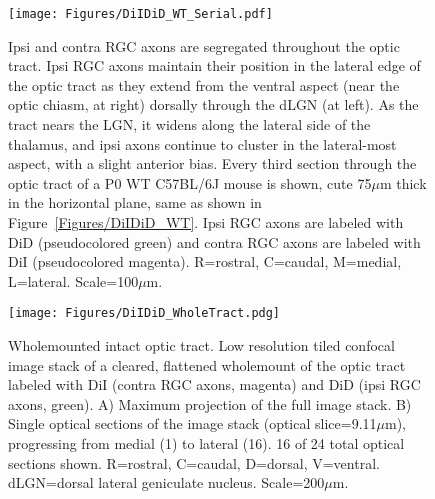 \begin{figure}[hbtp]
    \begin{center}
        \texttt{[image: Figures/DiIDiD\_WT\_Serial.pdf]}
        \caption[Ipsi and contra RGC axons are segregated throughout the optic tract.]
        {Ipsi and contra RGC axons are segregated throughout the optic tract.
        Ipsi RGC axons maintain their position in the lateral edge of the optic tract as they extend from the ventral aspect (near the optic chiasm, at right) dorsally through the dLGN (at left).
        As the tract nears the LGN, it widens along the lateral side of the thalamus, and ipsi axons continue to cluster in the lateral-most aspect, with a slight anterior bias.
        Every third section through the optic tract of a P0 WT C57BL/6J mouse is shown, cute 75$\mu$m thick in the horizontal plane, same as shown in Figure~\ref{Figures/DiIDiD_WT}.
        Ipsi RGC axons are labeled with DiD (pseudocolored green) and contra RGC axons are labeled with DiI (pseudocolored magenta).
        R=rostral, C=caudal, M=medial, L=lateral. 
		Scale=100$\mu$m.}
        \label{Figures/DiIDiD_WT_Serial}
    \end{center}
\end{figure}
\begin{figure}[hbtp]
    \begin{center}
        \texttt{[image: Figures/DiIDiD\_WholeTract.pdg]}
        \caption[Wholemounted intact optic tract.]
        {Wholemounted intact optic tract.
		Low resolution tiled confocal image stack of a cleared, flattened wholemount of the optic tract labeled with DiI (contra RGC axons, magenta) and DiD (ipsi RGC axons, green).
		A) Maximum projection of the full image stack.
		B) Single optical sections of the image stack (optical slice=9.11$\mu$m), progressing from medial (1) to lateral (16).
		16 of 24 total optical sections shown.
		R=rostral, C=caudal, D=dorsal, V=ventral.
		dLGN=dorsal lateral geniculate nucleus.
		Scale=200$\mu$m.
		}
        \label{Figures/DiIDiD_WholeTract}
    \end{center}
\end{figure}

